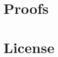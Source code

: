\begin{appendices}

\chapter{Proofs}\label{appendix:proofs}

\chapter{License}
\doclicenseFullText
\end{appendices}
